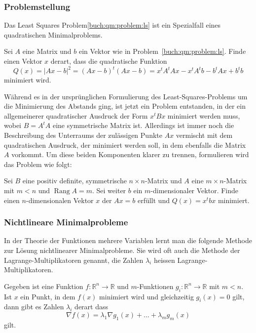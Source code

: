 %
%
\subsubsection{Problemstellung}
Das Least Squares Problem\ref{buch:qm:problem:ls} ist ein Spezialfall eines
quadratischen Minimalproblems.

\begin{problem}
\label{buch:qm:problem:ls2}
Sei $A$ eine Matrix und $b$ ein Vektor wie in Problem~\ref{buch:qm:problem:ls}.
Finde einen Vektor $x$ derart, dass die quadratische Funktion
\begin{equation}
Q(x)
=
|Ax-b|^2
=
(Ax-b)^t(Ax-b)
=
x^tA^tAx -x^tA^tb - b^tAx +b^t b
\label{buch:qm:eqn:ls2}
\end{equation}
minimiert wird.
\end{problem}

Während es in der ursprünglichen Formulierung des Least-Squares-Problems
um die Minimierung des Abstands ging, ist jetzt ein Problem entstanden,
in der ein allgemeinerer quadratischer Ausdruck der Form $x^tBx$ 
minimiert werden muss, wobei $B=A^tA$ eine symmetrische Matrix ist.
Allerdings ist immer noch die Beschreibung des Unterraums der zulässigen
Punkte $Ax$ vermischt mit dem quadratischen Ausdruck, der minimiert werden
soll, in dem ebenfalls die Matrix $A$ vorkommt.
Um diese beiden Komponenten klarer zu trennen, formulieren wird das
Problem wie folgt:

\begin{problem}
\label{buch:qm:problem:allg}
Sei $B$ eine positiv definite, symmetrische $n\times n$-Matrix 
und $A$ eine $m\times n$-Matrix mit $m<n$ und $\operatorname{Rang}A=m$.
Sei weiter $b$ ein $m$-dimensionaler Vektor.
Finde einen $n$-dimensionalen Vektor $x$ der $Ax=b$ erfüllt und
$Q(x)=x^tbx$ minimiert.
\end{problem}

%
%
\subsubsection{Nichtlineare Minimalprobleme}
%
%
In der Theorie der Funktionen mehrere Variablen lernt man die folgende
Methode zur Lösung nichtlinearer Minimalprobleme.
Sie wird oft auch die Methode der Lagrange-Multiplikatoren genannt,
die Zahlen $\lambda_i$ heissen Lagrange-Multiplikatoren.
%

\begin{lemma}
\label{buch:qm:lemma:lagrangemultiplikatoren}
Gegeben ist eine Funktion $f\colon \mathbb R^n \to \mathbb R$
und $m$-Funktionen $g_i\colon\mathbb R^n \to \mathbb R$ mit $m<n$.
Ist $x$ ein Punkt, in dem $f(x)$ minimiert wird und gleichzeitig
$g_i(x)=0$ gilt, dann gibt es Zahlen $\lambda_i$ derart dass
\[
\nabla f(x) = \lambda_1 \nabla g_1(x)  + \dots + \lambda_m g_m(x)
\]
gilt.
\end{lemma}

